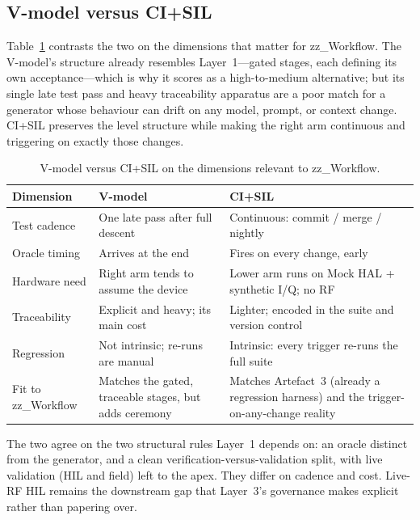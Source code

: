 \documentclass[11pt,a4paper]{article}
\begin{document}
\subsection{V-model versus CI+SIL}
\label{sec:contrast}

Table~\ref{tab:vsil} contrasts the two on the dimensions that matter for zz\_Workflow. The
V-model's structure already resembles Layer~1---gated stages, each defining its own
acceptance---which is why it scores as a high-to-medium alternative; but its single late test
pass and heavy traceability apparatus are a poor match for a generator whose behaviour can drift
on any model, prompt, or context change. CI+SIL preserves the level structure while making the
right arm continuous and triggering on exactly those changes.

\begin{table}[htbp]
\centering
\caption{V-model versus CI+SIL on the dimensions relevant to zz\_Workflow.}
\label{tab:vsil}
\small
\begin{tabular}{@{}lp{5.1cm}p{6.6cm}@{}}
\toprule
\textbf{Dimension} & \textbf{V-model} & \textbf{CI+SIL} \\
\midrule
Test cadence & One late pass after full descent & Continuous: commit / merge / nightly \\
Oracle timing & Arrives at the end & Fires on every change, early \\
Hardware need & Right arm tends to assume the device & Lower arm runs on Mock HAL + synthetic I/Q; no RF \\
Traceability & Explicit and heavy; its main cost & Lighter; encoded in the suite and version control \\
Regression & Not intrinsic; re-runs are manual & Intrinsic: every trigger re-runs the full suite \\
Fit to zz\_Workflow & Matches the gated, traceable stages, but adds ceremony & Matches Artefact~3 (already a regression harness) and the trigger-on-any-change reality \\
\bottomrule
\end{tabular}
\end{table}

The two agree on the two structural rules Layer~1 depends on: an oracle distinct from the
generator, and a clean verification-versus-validation split, with live validation (HIL and field)
left to the apex. They differ on cadence and cost. Live-RF HIL remains the downstream gap that
Layer~3's governance makes explicit rather than papering over.
\end{document}
